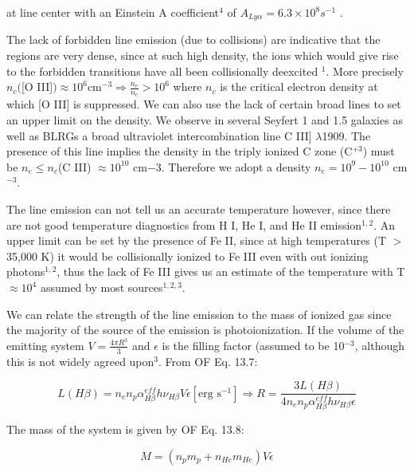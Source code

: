 \documentclass[12pt]{article}   	%
\begin{document}
at line center with an Einstein A coefficient$^{4}$ of $A_{Ly\alpha} = 6.3 \times 10^8 s^{-1}$ . 

	The lack of forbidden line emission (due to collisions)  are indicative that the regions are very dense,  since at such high density, the ions which would give rise to the forbidden transitions have all been collisionally deexcited $^{1}$.  More precisely $n_{c} ( $[O III]$ ) \approx 10^{6} $cm$^{-3}  \Rightarrow \frac{n_{e}}{ n_{c}} > 10^{6}$ where $n_{c}$ is the critical electron density at which [O III] is suppressed. We can also use the lack of certain broad lines to set an upper limit on the density. We observe in several Seyfert 1 and 1.5 galaxies as well as BLRGs a broad ultraviolet intercombination line C III] $\lambda$1909. The presence of this line implies the density in the triply ionized C zone (C$^{+3}$) must be $n_{e} \leq n_{c} $(C III) $\approx 10^{10}$ cm${-3}$. Therefore we adopt a density $n_{e} = 10^{9} - 10^{10}$ cm$^{-3}$.


	The line emission can not tell us an accurate temperature however, since there are not good temperature diagnostics from H I, He I, and He II emission$^{1,2}$. An upper limit can be set by the presence of Fe II, since at high temperatures (T $>$ 35,000 K) it would be collisionally ionized to Fe III even with out ionizing photons$^{1,2}$, thus the lack of Fe III gives us an estimate of the temperature with T $\approx 10^{4}$ assumed by most sources$^{1,2,3}$.

We can relate the strength of the line emission to the mass of ionized gas since the majority of the source of the emission is photoionization. If the volume of the emitting system $V = \frac{4 \pi R^{3}}{3}$ and $\epsilon$ is the filling factor (assumed to be 10$^{-3}$, although this is not widely agreed upon$^{3}$. From OF Eq. 13.7:


\begin{equation}
L (H\beta) = n_{e}n_{p} \alpha^{eff}_{H\beta} h \nu_{H\beta} V \epsilon [\text{erg s}^{-1}] \Rightarrow R = \frac{3 L (H\beta)}{4 n_{e}n_{p} \alpha^{eff}_{H\beta} h \nu_{H\beta} \epsilon}
\end{equation}

 The mass of the system is given by OF Eq. 13.8:

\begin{equation}
M = (n_{p}m_{p} + n_{He}m_{He})V\epsilon
\end{equation}
\end{document}
